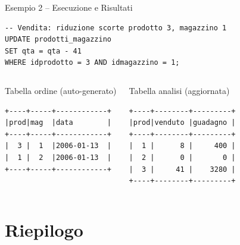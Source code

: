 \documentclass[aspectratio=169]{beamer}
\begin{document}
\begin{frame}[fragile]{Esempio 2 -- Esecuzione e Risultati}
  \begin{lstlisting}[style=sqlstyle]
-- Vendita: riduzione scorte prodotto 3, magazzino 1
UPDATE prodotti_magazzino
SET qta = qta - 41
WHERE idprodotto = 3 AND idmagazzino = 1;
  \end{lstlisting}
  \begin{columns}[T]
      \begin{exampleblock}{Tabella ordine (auto-generato)}
        \begin{lstlisting}[style=outputstyle]
+----+-----+------------+
|prod|mag  |data        |
+----+-----+------------+
|  3 |  1  |2006-01-13  |
|  1 |  2  |2006-01-13  |
+----+-----+------------+
        \end{lstlisting}
      \end{exampleblock}
      \begin{exampleblock}{Tabella analisi (aggiornata)}
        \begin{lstlisting}[style=outputstyle]
+----+--------+---------+
|prod|venduto |guadagno |
+----+--------+---------+
|  1 |      8 |     400 |
|  2 |      0 |       0 |
|  3 |     41 |    3280 |
+----+--------+---------+
        \end{lstlisting}
      \end{exampleblock}
  \end{columns}
\end{frame}

\section{Riepilogo}
\end{document}
